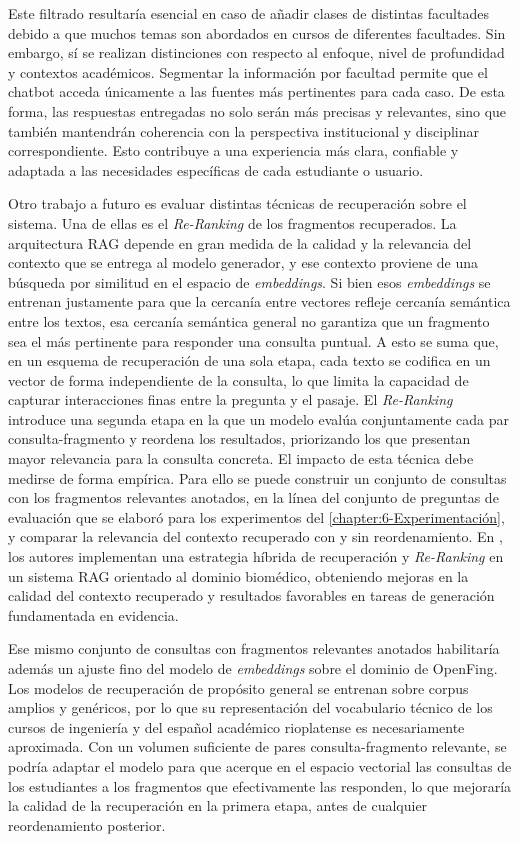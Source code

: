 Este filtrado resultaría esencial en caso de añadir clases de distintas facultades debido a que muchos temas son abordados en cursos de diferentes facultades. Sin embargo, sí se realizan distinciones con respecto al enfoque, nivel de profundidad y contextos académicos. Segmentar la información por facultad permite que el chatbot acceda únicamente a las fuentes más pertinentes para cada caso. De esta forma, las respuestas entregadas no solo serán más precisas y relevantes, sino que también mantendrán coherencia con la perspectiva institucional y disciplinar correspondiente. Esto contribuye a una experiencia más clara, confiable y adaptada a las necesidades específicas de cada estudiante o usuario.
 
Otro trabajo a futuro es evaluar distintas técnicas de recuperación sobre el sistema. Una de ellas es el \textit{Re-Ranking} de los fragmentos recuperados. La arquitectura RAG depende en gran medida de la calidad y la relevancia del contexto que se entrega al modelo generador, y ese contexto proviene de una búsqueda por similitud en el espacio de \textit{embeddings}. Si bien esos \textit{embeddings} se entrenan justamente para que la cercanía entre vectores refleje cercanía semántica entre los textos, esa cercanía semántica general no garantiza que un fragmento sea el más pertinente para responder una consulta puntual. A esto se suma que, en un esquema de recuperación de una sola etapa, cada texto se codifica en un vector de forma independiente de la consulta, lo que limita la capacidad de capturar interacciones finas entre la pregunta y el pasaje. El \textit{Re-Ranking} introduce una segunda etapa en la que un modelo evalúa conjuntamente cada par consulta-fragmento y reordena los resultados, priorizando los que presentan mayor relevancia para la consulta concreta. El impacto de esta técnica debe medirse de forma empírica. Para ello se puede construir un conjunto de consultas con los fragmentos relevantes anotados, en la línea del conjunto de preguntas de evaluación que se elaboró para los experimentos del \autoref{chapter:6-Experimentación}, y comparar la relevancia del contexto recuperado con y sin reordenamiento. En \cite{irany2026hybrid}, los autores implementan una estrategia híbrida de recuperación y \textit{Re-Ranking} en un sistema RAG orientado al dominio biomédico, obteniendo mejoras en la calidad del contexto recuperado y resultados favorables en tareas de generación fundamentada en evidencia.

Ese mismo conjunto de consultas con fragmentos relevantes anotados habilitaría además un ajuste fino del modelo de \textit{embeddings} sobre el dominio de OpenFing. Los modelos de recuperación de propósito general se entrenan sobre corpus amplios y genéricos, por lo que su representación del vocabulario técnico de los cursos de ingeniería y del español académico rioplatense es necesariamente aproximada. Con un volumen suficiente de pares consulta-fragmento relevante, se podría adaptar el modelo para que acerque en el espacio vectorial las consultas de los estudiantes a los fragmentos que efectivamente las responden, lo que mejoraría la calidad de la recuperación en la primera etapa, antes de cualquier reordenamiento posterior.

